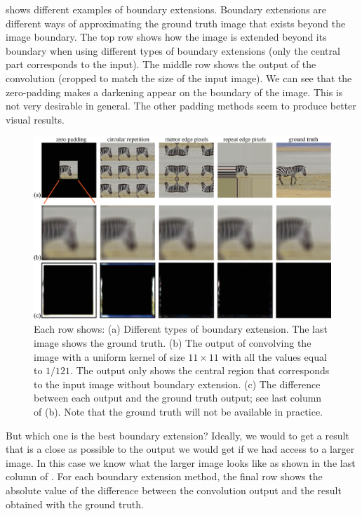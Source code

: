 \Fig{\ref{fig:boundaries}} shows different examples of boundary extensions. Boundary extensions are different ways of approximating the ground truth image that exists beyond the image boundary. 
The top row shows how the image is extended beyond its boundary when using different types of boundary extensions (only the central part corresponds to the input). The middle row shows the output of the convolution (cropped to match the size of the input image). We can see that the zero-padding makes a darkening appear on the boundary of the image. This is not very desirable in general. The other padding methods seem to produce better visual results. 


\begin{figure}
\includegraphics[width=1\linewidth]{figures/linear_image_filtering/boundary.eps}
\caption{Each row shows: (a) Different types of boundary extension. The last image shows the ground truth. (b) The output of convolving the image with a uniform kernel of size $11 \times 11$ with all the values equal to $1/121$. The output only shows the central region that corresponds to the input image without boundary extension. (c) The difference between each output and the ground truth output; see last column of (b). Note that the ground truth will not be available in practice.
} 
\label{fig:boundaries}
\end{figure}

But which one is the best boundary extension? Ideally, we would to get a result that is a close as possible to the output we would get if we had access to a larger image. In this case we know what the larger image looks like as shown in the last column of \fig{\ref{fig:boundaries}}. For each boundary extension method, the final row shows the absolute value of the difference between the convolution output and the result obtained with the ground truth. 

